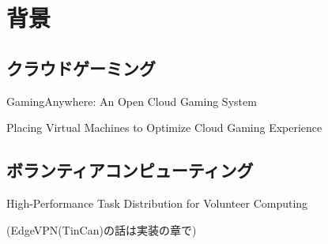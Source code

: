 \section{背景}

\subsection{クラウドゲーミング}

GamingAnywhere: An Open Cloud Gaming System


Placing Virtual Machines to Optimize
Cloud Gaming Experience


\subsection{ボランティアコンピューティング}
High-Performance Task Distribution for Volunteer Computing 


(EdgeVPN(TinCan)の話は実装の章で)